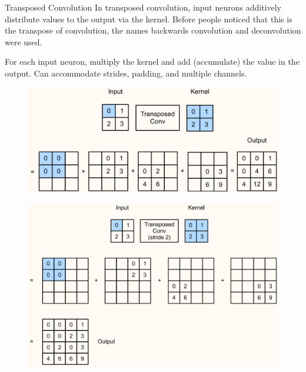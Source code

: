 \begin{frame}[allowframebreaks]

\begin{mydefinitionblock}{8.15}{Transposed Convolution}
    In transposed convolution, input neurons additively distribute values to the output via the kernel.
    Before people noticed that this is the transpose of convolution, the names backwards convolution and deconvolution were used.

    For each input neuron, multiply the kernel and add (accumulate) the value in the output.
    Can accommodate strides, padding, and multiple channels.

    \begin{figure}[H]
        \centering
        \includegraphics[width=1.0\textwidth]{.././assets/8.13.png}
    \end{figure}

    \begin{figure}[H]
        \centering
        \includegraphics[width=1.0\textwidth]{.././assets/8.14.png}
    \end{figure}
\end{mydefinitionblock}

\end{frame}


